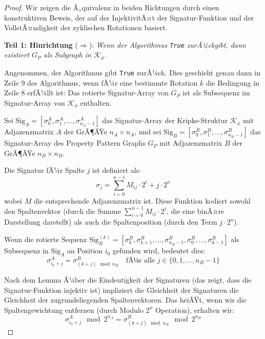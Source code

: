 ﻿\documentclass[a4paper,12pt]{article}
\theoremstyle{definition}
\begin{document}
\begin{proof}
Wir zeigen die Ã„quivalenz in beiden Richtungen durch einen konstruktiven Beweis, der auf der InjektivitÃ¤t der Signatur-Funktion und der VollstÃ¤ndigkeit der zyklischen Rotationen basiert.

\textbf{Teil 1: Hinrichtung} ($\Rightarrow$): \textit{Wenn der Algorithmus \texttt{True} zurÃ¼ckgibt, dann existiert $G_P$ als Subgraph in $\mathcal{K}_{\phi}$.}

Angenommen, der Algorithmus gibt \texttt{True} zurÃ¼ck. Dies geschieht genau dann in Zeile 9 des Algorithmus, wenn fÃ¼r eine bestimmte Rotation $k$ die Bedingung in Zeile 8 erfÃ¼llt ist: Das rotierte Signatur-Array von $G_P$ ist als Subsequenz im Signatur-Array von $\mathcal{K}_{\phi}$ enthalten.

Sei $\text{Sig}_A = [\sigma_0^A, \sigma_1^A, \ldots, \sigma_{n_A-1}^A]$ das Signatur-Array der Kripke-Struktur $\mathcal{K}_{\phi}$ mit Adjazenzmatrix $A$ der GrÃ¶ÃŸe $n_A \times n_A$, und sei $\text{Sig}_B = [\sigma_0^B, \sigma_1^B, \ldots, \sigma_{n_B-1}^B]$ das Signatur-Array des Property Pattern Graphs $G_P$ mit Adjazenzmatrix $B$ der GrÃ¶ÃŸe $n_B \times n_B$.

Die Signatur fÃ¼r Spalte $j$ ist definiert als:
\begin{equation}
\sigma_j = \sum_{i=0}^{n-1} M_{ij} \cdot 2^i + j \cdot 2^n
\end{equation}
wobei $M$ die entsprechende Adjazenzmatrix ist. Diese Funktion kodiert sowohl den Spaltenvektor (durch die Summe $\sum_{i=0}^{n-1} M_{ij} \cdot 2^i$, die eine binÃ¤re Darstellung darstellt) als auch die Spaltenposition (durch den Term $j \cdot 2^n$).

Wenn die rotierte Sequenz $\text{Sig}_B^{(k)} = [\sigma_k^B, \sigma_{k+1}^B, \ldots, \sigma_{n_B-1}^B, \sigma_0^B, \ldots, \sigma_{k-1}^B]$ als Subsequenz in $\text{Sig}_A$ an Position $i_0$ gefunden wird, bedeutet dies:
\begin{equation}
\sigma_{i_0+j}^A = \sigma_{(k+j) \mod n_B}^B \quad \text{fÃ¼r alle } j \in \{0, 1, \ldots, n_B-1\}
\end{equation}

Nach dem Lemma Ã¼ber die Eindeutigkeit der Signaturen (das zeigt, dass die Signatur-Funktion injektiv ist) impliziert die Gleichheit der Signaturen die Gleichheit der zugrundeliegenden Spaltenvektoren. Das heiÃŸt, wenn wir die Spaltengewichtung entfernen (durch Modulo $2^n$ Operation), erhalten wir:
\begin{equation}
\sigma_{i_0+j}^A \mod 2^{n_A} = \sigma_{(k+j) \mod n_B}^B \mod 2^{n_B}
\end{equation}


\end{proof}
\end{document}

